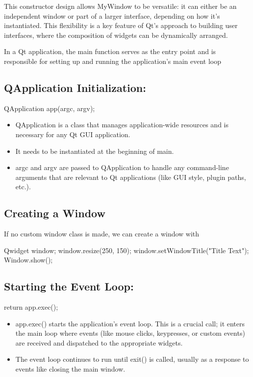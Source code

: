\documentclass{report}
\begin{document}
    \bigbreak \noindent 
    This constructor design allows MyWindow to be versatile: it can either be an independent window or part of a larger interface, depending on how it's instantiated. This flexibility is a key feature of Qt's approach to building user interfaces, where the composition of widgets can be dynamically arranged.

    \pagebreak
    \bigbreak \noindent 
    In a Qt application, the main function serves as the entry point and is responsible for setting up and running the application's main event loop
    \bigbreak \noindent 
    \subsection{QApplication Initialization:}
    \bigbreak \noindent 
    \begin{cppcode}
    QApplication app(argc, argv);
    \end{cppcode}
    \begin{itemize}
        \item QApplication is a class that manages application-wide resources and is necessary for any Qt GUI application.
        \item It needs to be instantiated at the beginning of main.
        \item argc and argv are passed to QApplication to handle any command-line arguments that are relevant to Qt applications (like GUI style, plugin paths, etc.).
    \end{itemize}

    \bigbreak \noindent 
    \subsection{Creating a Window}
    \bigbreak \noindent 
    If no custom window class is made, we can create a window with
    \bigbreak \noindent 
    \begin{cppcode}
Qwidget window;
window.resize(250, 150);
window.setWindowTitle("Title Text");
Window.show();
    \end{cppcode}

    \bigbreak \noindent 
    \subsection{Starting the Event Loop:}
    \bigbreak \noindent 
    \begin{cppcode}
    return app.exec();
    \end{cppcode}
    \begin{itemize}
        \item app.exec() starts the application's event loop. This is a crucial call; it enters the main loop where events (like mouse clicks, keypresses, or custom events) are received and dispatched to the appropriate widgets.
        \item The event loop continues to run until exit() is called, usually as a response to events like closing the main window.
    \end{itemize}
\end{document}
